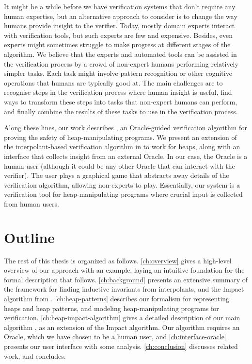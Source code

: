 It might be a while before we have verification systems that don't require any human
expertise, but an alternative approach to consider is to change the way humans provide
insight to the verifier. Today, mostly domain experts interact with verification tools,
but such experts are few and expensive. Besides, even experts might sometimes struggle to
make progress at different stages of the algorithm. We believe that the experts and
automated tools can be assisted in the verification process by a crowd of non-expert
humans performing relatively simpler tasks. Each task might involve pattern recognition
or other cognitive operations that humans are typically good at. The main challenges are
to recognise steps in the verification process where human insight is useful, find ways
to transform these steps into tasks that non-expert humans can perform, and finally
combine the results of these tasks to use in the verification process.

Along these lines, our work describes \verifier, an Oracle-guided
verification algorithm for proving the safety of heap-manipulating programs. We present
an extension of the interpolant-based verification algorithm in \cite{mcmillan06} to work
for heaps, along with an interface that collects insight from an external Oracle. In our
case, the Oracle is a human user (although it could be any other Oracle that can interact
with the verifier). The user plays a graphical game that abstracts away details of the
verification algorithm, allowing non-experts to play. Essentially, our system is a
verification tool for heap-manipulating programs where crucial input is collected from
human users.

\section{Outline}

The rest of this thesis is organized as follows. \autoref{ch:overview} gives a high-level
overview of our approach with an example, laying an intuitive foundation for the formal
description that follows. \autoref{ch:background} presents an extensive summary of the
framework for finding inductive invariants from interpolants, and the Impact algorithm
from \cite{mcmillan06}. \autoref{ch:heap-patterns} describes our formalism for
representing heaps and heap patterns, and modeling heap-manipulating programs for
verification. \autoref{ch:heap-impact-algorithm} gives a detailed description of our
main algorithm \verifier, as an extension of the Impact algorithm. Our algorithm
requires an Oracle, which we have chosen to be a human user, and
\autoref{ch:interface-oracle} presents our user interface with some analysis.
\autoref{ch:conclusion} discusses related work, and concludes.

